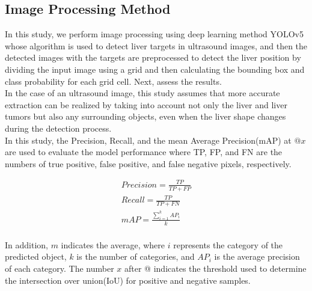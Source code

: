 \documentclass[12pt, a4paper]{article}
\begin{document}
\subsection*{Image Processing Method}

In this study, we perform image processing using deep learning method YOLOv5 whose algorithm is used to detect liver targets in ultrasound images, and then the detected images with the targets are preprocessed to detect the liver position by dividing the input image using a grid and then calculating the bounding box and class probability for each grid cell. Next, assess the results.\\



\setlength{\parindent}{1em}
In the case of an ultrasound image, this study assumes that more accurate extraction can be realized by taking into account not only the liver and liver tumors but also any surrounding objects, even when the liver shape changes during the detection process.\\

\setlength{\parindent}{1em}
In this study, the Precision, Recall, and the mean Average Precision(mAP) at $@x$ are used to evaluate the model performance where TP, FP, and FN are the numbers of true positive, false positive, and false negative pixels, respectively.


\begin{eqnarray}%
	Precision = \frac{TP}{TP+FP}\\
	Recall = \frac{TP}{TP+FN}\\
	mAP = \frac{\sum_{i=1}^{k} AP_i}{k}\\
	\nonumber
\end{eqnarray}

In addition, $m$ indicates the average, where $i$ represents the category of the predicted object, $k$ is the number of categories, and $AP_i$ is the average precision of each category. The number $x$ after @ indicates the threshold used to determine the intersection over union(IoU) for positive and negative samples.
\end{document}
